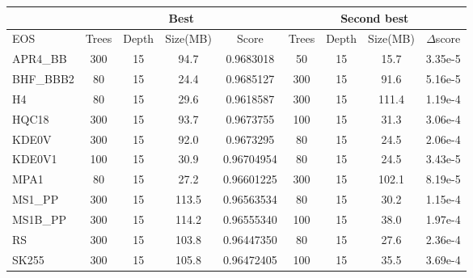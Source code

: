 \begin{table}[h]
\centering
\begin{tabular}{@{}lcccccccc@{}}
\toprule
                                & \multicolumn{4}{c}{Best}                                & \multicolumn{4}{c}{Second best}                            \\ \midrule
\multicolumn{1}{|l|}{EOS}       & Trees & Depth & Size(MB)    & \multicolumn{1}{c|}{Score}      & Trees & Depth & Size(MB)    & \multicolumn{1}{c|}{$\Delta$score} \\ \midrule
\multicolumn{1}{|l|}{APR4\_BB}  & 300   & 15    & 94.7  & \multicolumn{1}{c|}{0.9683018}  & 50    & 15    & 15.7  & \multicolumn{1}{c|}{3.35e-5}       \\ \midrule
\multicolumn{1}{|l|}{BHF\_BBB2} & 80    & 15    & 24.4  & \multicolumn{1}{c|}{0.9685127}  & 300   & 15    & 91.6  & \multicolumn{1}{c|}{5.16e-5}       \\ \midrule
\multicolumn{1}{|l|}{H4}        & 80    & 15    & 29.6  & \multicolumn{1}{c|}{0.9618587}  & 300   & 15    & 111.4 & \multicolumn{1}{c|}{1.19e-4}       \\ \midrule
\multicolumn{1}{|l|}{HQC18}     & 300   & 15    & 93.7  & \multicolumn{1}{c|}{0.9673755}  & 100   & 15    & 31.3  & \multicolumn{1}{c|}{3.06e-4}       \\ \midrule
\multicolumn{1}{|l|}{KDE0V}     & 300   & 15    & 92.0  & \multicolumn{1}{c|}{0.9673295}  & 80    & 15    & 24.5  & \multicolumn{1}{c|}{2.06e-4}       \\ \midrule
\multicolumn{1}{|l|}{KDE0V1}    & 100   & 15    & 30.9  & \multicolumn{1}{c|}{0.96704954} & 80    & 15    & 24.5  & \multicolumn{1}{c|}{3.43e-5}       \\ \midrule
\multicolumn{1}{|l|}{MPA1}      & 80    & 15    & 27.2  & \multicolumn{1}{c|}{0.96601225} & 300   & 15    & 102.1 & \multicolumn{1}{c|}{8.19e-5}       \\ \midrule
\multicolumn{1}{|l|}{MS1\_PP}   & 300   & 15    & 113.5 & \multicolumn{1}{c|}{0.96563534} & 80    & 15    & 30.2  & \multicolumn{1}{c|}{1.15e-4}       \\ \midrule
\multicolumn{1}{|l|}{MS1B\_PP}  & 300   & 15    & 114.2 & \multicolumn{1}{c|}{0.96555340} & 100   & 15    & 38.0  & \multicolumn{1}{c|}{1.97e-4}       \\ \midrule
\multicolumn{1}{|l|}{RS}        & 300   & 15    & 103.8 & \multicolumn{1}{c|}{0.96447350} & 80    & 15    & 27.6  & \multicolumn{1}{c|}{2.36e-4}       \\ \midrule
\multicolumn{1}{|l|}{SK255}     & 300   & 15    & 105.8 & \multicolumn{1}{c|}{0.96472405} & 100   & 15    & 35.5  & \multicolumn{1}{c|}{3.69e-4}       \\ \midrule

\end{tabular}
\end{table}
